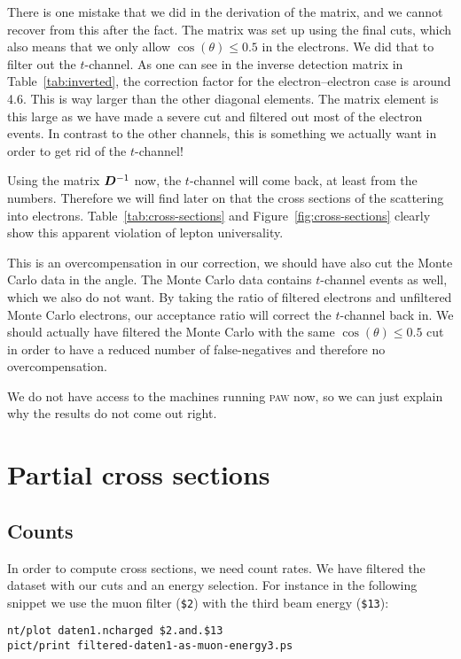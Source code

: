\documentclass[11pt, english, fleqn, DIV=15, headinclude, BCOR=2cm]{scrreprt}
\begin{document}
There is one mistake that we did in the derivation of the matrix, and we cannot
recover from this after the fact. The matrix was set up using the final cuts,
which also means that we only allow $\cos(\theta) \leq \num{0.5}$ in the
electrons. We did that to filter out the $t$-channel. As one can see in the
inverse detection matrix in Table~\ref{tab:inverted}, the correction factor for
the electron--electron case is around \num{4.6}. This is way larger than the
other diagonal elements. The matrix element is this large as we have made a
severe cut and filtered out most of the electron events. In contrast to the
other channels, this is something we actually want in order to get rid of the
$t$-channel!

Using the matrix $\mat D\inv$ now, the $t$-channel will come back, at least
from the numbers. Therefore we will find later on that the cross sections of
the scattering into electrons. Table~\ref{tab:cross-sections} and
Figure~\ref{fig:cross-sections} clearly show this apparent violation of lepton
universality.

This is an overcompensation in our correction, we should have also cut the
Monte Carlo data in the angle. The Monte Carlo data contains $t$-channel events
as well, which we also do not want. By taking the ratio of filtered electrons
and unfiltered Monte Carlo electrons, our acceptance ratio will correct the
$t$-channel back in. We should actually have filtered the Monte Carlo with the
same $\cos(\theta) \leq \num{0.5}$ cut in order to have a reduced number of
false-negatives and therefore no overcompensation.

We do not have access to the machines running \textsc{paw} now, so we can just
explain why the results do not come out right.

\section{Partial cross sections}

\subsection{Counts}

In order to compute cross sections, we need count rates. We have filtered the
dataset with our cuts and an energy selection. For instance in the following
snippet we use the muon filter (\texttt{\$2}) with the third beam energy
(\texttt{\$13}):

\begin{lstlisting}
nt/plot daten1.ncharged $2.and.$13
pict/print filtered-daten1-as-muon-energy3.ps
\end{lstlisting}
\end{document}

